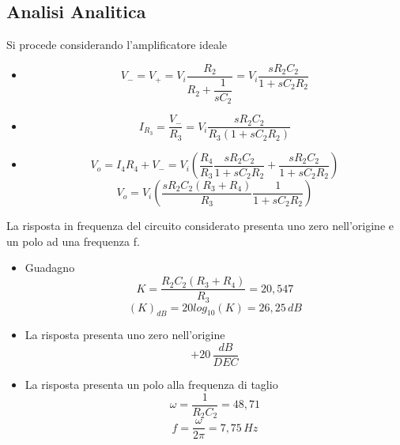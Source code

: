 \subsection{Analisi Analitica}\label{subsec:analisiAnalitica}
Si procede considerando l'amplificatore ideale
\begin{itemize}
\item 
    \begin{equation}\label{eq:eqMorsettiAmplificatore}
    V_{-} = V_{+} = V_{i} \dfrac{R_{2}}{R_{2} + \dfrac{1}{sC_{2}}} = V_{i} \dfrac{sR_{2}C_{2}}{1 + sC_{2}R_{2}}
    \end{equation}
\item 
    \begin{equation}\label{eq:eqCorrenteR3}
    I_{R_{3}} = \dfrac{V_{-}}{R_{3}} = V_{i} \dfrac{sR_{2}C_{2}}{R_{3} (1 + sC_{2}R_{2})}
    \end{equation}
\item
    \begin{equation}\label{eq:eqTensioneUscita1}
    V_{o} = I_{4} R_{4} + V_{-} = V_{i} ( \dfrac{R_{4}}{R_{3}} \dfrac{sR_{2}C_{2}}{1 + sC_{2}R_{2}} + \dfrac{sR_{2}C_{2}}{1 + sC_{2}R_{2}} )
    \end{equation}
    \begin{equation}\label{eq:eqTensioneUscita2}
    V_{o} = V_{i} ( \dfrac{sR_{2}C_{2} (R_{3}+R_{4})}{R_{3}} \dfrac{1}{1 + sC_{2}R_{2}}  )
    \end{equation}
\end{itemize}
La risposta in frequenza del circuito considerato presenta uno zero nell'origine e un polo ad una frequenza f.
\begin{itemize}
\item 
    Guadagno \begin{equation}\label{eq:eqGuadagno}
    K = \dfrac{R_{2}C_{2} (R_{3}+R_{4})}{R_{3}} = 20,547
    \end{equation}
    \begin{equation}\label{eq:eqGuadagnoDecibel}
    (K)_{dB} = 20 log_{10} (K) = 26,25\hspace{2pt}dB
    \end{equation}
\item 
    La risposta presenta uno zero nell'origine
    \begin{equation}\label{eq:eqPoloOrigine}
    +20 \hspace{2pt}\dfrac{dB}{DEC}
    \end{equation}
\item
    La risposta presenta un polo alla frequenza di taglio
    \begin{equation}\label{eq:eqPulsazioneTaglio}
    \omega = \dfrac{1}{R_{2}C_{2}} = 48,71
    \end{equation}
    \begin{equation}\label{eq:eqFrequenzaTaglio}
    f = \dfrac{\omega}{2\pi} = 7,75\hspace{2pt}Hz
    \end{equation}
\end{itemize}

